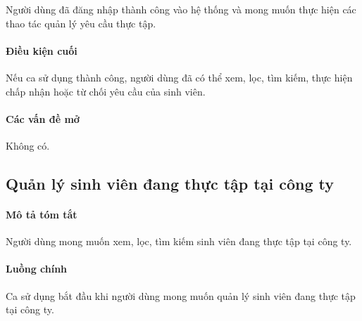 \documentclass[./../main.tex]{subfiles}
\begin{document}
Người dùng đã đăng nhập thành công vào hệ thống và mong muốn thực hiện các thao tác quản lý yêu cầu thực tập.

\paragraph*{Điều kiện cuối}

Nếu ca sử dụng thành công, người dùng đã có thể xem, lọc, tìm kiếm, thực hiện chấp nhận hoặc từ chối yêu cầu của sinh viên.

\paragraph*{Các vấn đề mở}

Không có.

\subsection{Quản lý sinh viên đang thực tập tại công ty}

\paragraph*{Mô tả tóm tắt}

Người dùng mong muốn xem, lọc, tìm kiếm sinh viên đang thực tập tại công ty.

\paragraph*{Luồng chính} Ca sử dụng bắt đầu khi người dùng mong muốn quản lý sinh viên đang thực tập tại công ty.
\end{document}
